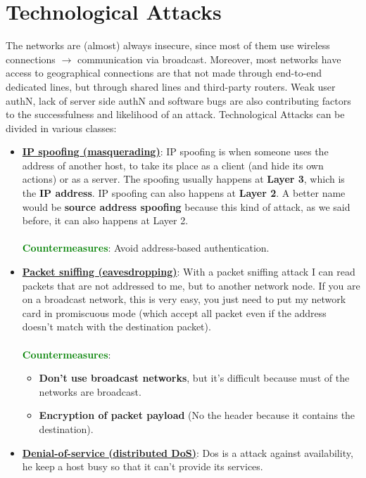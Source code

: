 \section{Technological Attacks}
The networks are (almost) always insecure, since most of them use wireless connections \(\rightarrow \) communication via broadcast. Moreover, most networks have access to geographical connections are that not made through end-to-end dedicated lines, but through shared lines
and third-party routers. Weak user authN, lack of server side authN and software bugs are also
contributing factors to the successfulness and likelihood of an attack.
Technological Attacks can be divided in various classes: 
\begin{itemize}
    \item \underline{\textbf{IP spoofing (masquerading)}}: IP spoofing is when someone uses the address of another host, to take its place as a client (and hide its own actions) or as a server. The spoofing usually happens at \textbf{Layer 3}, which is the \textbf{IP address}. IP spoofing can also happens at \textbf{Layer 2}. A better name would be \textbf{source address spoofing} because this kind of attack, as we said before, it can also happens at Layer 2.\\
    \\
    \textcolor{green}{\textbf{Countermeasures}}: Avoid address-based authentication.
    \item \underline{\textbf{Packet sniffing (eavesdropping)}}: With a packet sniffing attack I can read packets that are not addressed to me, but
    to another network node. If you are on a broadcast network, this is very easy, you
    just need to put my network card in promiscuous mode (which accept all packet even if the address doesn’t match with the destination packet).\\
    \\
    \textcolor{green}{\textbf{Countermeasures}}:
    \begin{itemize}
        \item \textbf{Don't use broadcast networks}, but it's difficult because must of the networks are broadcast.  
        \item \textbf{Encryption of packet payload} (No the header because it contains the destination).
    \end{itemize}
    \item \underline{\textbf{Denial-of-service (distributed DoS)}}: Dos is a attack against availability, he keep a host busy so that it can't provide its services.\\

\end{itemize}
